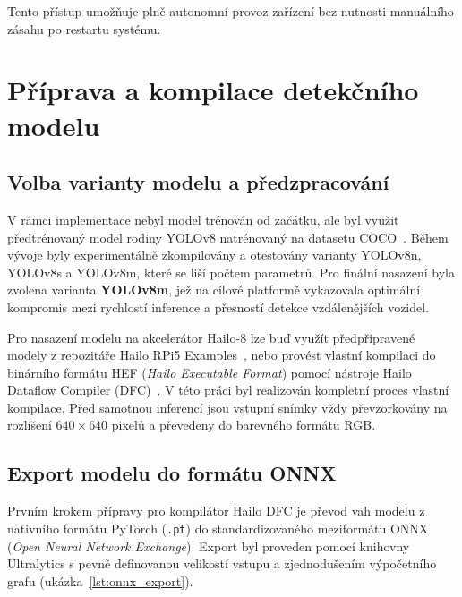 \documentclass[male,czech,api_bc]{kitheses}
\begin{document}
Tento přístup umožňuje plně autonomní provoz zařízení bez nutnosti manuálního zásahu po restartu systému. 

\section{Příprava a kompilace detekčního modelu}
\subsection{Volba varianty modelu a předzpracování}

V rámci implementace nebyl model trénován od začátku, ale byl využit předtrénovaný model rodiny YOLOv8 natrénovaný na datasetu COCO~\cite{lin_coco_2014}. Během vývoje byly experimentálně zkompilovány a otestovány varianty YOLOv8n, YOLOv8s a YOLOv8m, které se liší počtem parametrů. Pro finální nasazení byla zvolena varianta \textbf{YOLOv8m}, jež na cílové platformě vykazovala optimální kompromis mezi rychlostí inference a přesností detekce vzdálenějších vozidel.

Pro nasazení modelu na akcelerátor Hailo-8 lze buď využít předpřipravené modely z repozitáře Hailo RPi5 Examples~\cite{hailo_rpi5_examples}, nebo provést vlastní kompilaci do binárního formátu HEF (\textit{Hailo Executable Format}) pomocí nástroje Hailo Dataflow Compiler (DFC)~\cite{hailo_dfc_docs}. V této práci byl realizován kompletní proces vlastní kompilace. Před samotnou inferencí jsou vstupní snímky vždy převzorkovány na rozlišení $640 \times 640$ pixelů a převedeny do barevného formátu RGB.

\subsection{Export modelu do formátu ONNX}
Prvním krokem přípravy pro kompilátor Hailo DFC je převod vah modelu z nativního formátu PyTorch (\texttt{.pt}) do standardizovaného meziformátu ONNX (\textit{Open Neural Network Exchange}). Export byl proveden pomocí knihovny Ultralytics s pevně definovanou velikostí vstupu a zjednodušením výpočetního grafu (ukázka~\ref{lst:onnx_export}).
\end{document}
